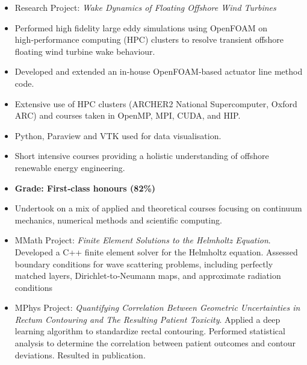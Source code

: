 \documentclass{cv}
\renewcommand{\cvitemskip}{\vspace{0.8em}}
\begin{document}
\makecvheader
\vspace{-1em}
\begin{itemize}
	\item Research Project: \textit{Wake Dynamics of Floating Offshore Wind Turbines} 
	\item Performed high fidelity large eddy simulations using OpenFOAM on high‑performance computing (HPC) clusters to resolve transient offshore floating wind turbine wake behaviour.
	\item Developed and extended an in‑house OpenFOAM‑based actuator line method code.
	\item Extensive use of HPC clusters (ARCHER2 National Supercomputer, Oxford ARC) and courses taken in OpenMP, MPI, CUDA, and HIP.
	\item Python, Paraview and VTK used for data visualisation.
\end{itemize} 
\cvitemskip

\begin{itemize}
	\item Short intensive courses providing a holistic understanding of offshore renewable energy engineering.
\end{itemize}
\cvitemskip

\begin{itemize}
	\item[] \textbf{Grade: First‑class honours (82\%)}
	\item Undertook on a mix of applied and theoretical courses focusing on continuum mechanics, numerical methods and scientific computing.
	\item MMath Project: \textit{Finite Element Solutions to the Helmholtz Equation}. Developed a C++ finite element solver for the Helmholtz equation. Assessed boundary conditions for wave scattering problems, including perfectly matched layers, Dirichlet‑to‑Neumann maps, and approximate radiation conditions
	\item MPhys Project: \textit{Quantifying Correlation Between Geometric Uncertainties in Rectum Contouring and The Resulting Patient Toxicity}. Applied a deep learning algorithm to standardize rectal contouring. Performed statistical analysis to determine the correlation between patient outcomes and contour deviations. Resulted in publication.
\end{itemize}
\end{document}
